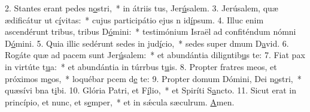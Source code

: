 2. Stantes erant pedes n\uline{o}stri,~* in átriis tus, Jer\uline{ú}salem.
3. Jerúsalem, quæ ædificátur ut c\uline{í}vitas:~* cujus participátio ejus n id\uline{í}psum.
4. Illuc enim ascendérunt tribus, tribus D\uline{ó}mini:~* testimónium Israël ad confiténdum nómni D\uline{ó}mini.
5. Quia illic sedérunt sedes in jud\uline{í}cio,~* sedes super dmum D\uline{a}vid.
6. Rogáte quæ ad pacem sunt Jer\uline{ú}salem:~* et abundántia diligntib\uline{u}s te:
7. Fiat pax in virtúte t\uline{u}a:~* et abundántia in túrrbus t\uline{u}is.
8. Propter fratres meos, et próximos m\uline{e}os,~* loquébar pcem d\uline{e} te:
9. Propter domum Dómini, Dei n\uline{o}stri,~* quæsívi bna t\uline{i}bi.
10. Glória Patri, et F\uline{í}lio,~* et Spiríti S\uline{a}ncto.
11. Sicut erat in princípio, et nunc, et s\uline{e}mper,~* et in sǽcula sæculrum. \uline{A}men.
